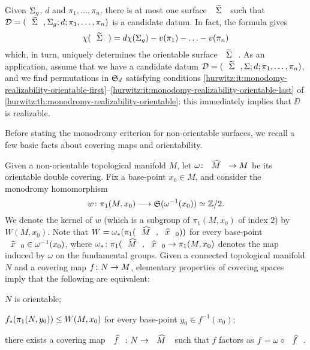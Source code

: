\begin{remark}\label{hurwitz:rm:sigma-tilde-unique-orientable}
Given $\Sigma_{g}$, $d$ and $\pi_1,\ldots,\pi_n$, there is at most one surface $\tSigma$ such that $\DD=\datum{\tSigma,\surf{g}}{d}{\pi_1,\ldots,\pi_n}$ is a candidate datum. In fact, the \RH{} formula gives
\[
\chi(\tSigma)=d\chi(\surf{g})-v(\pi_1)-\ldots-v(\pi_n)
\]
which, in turn, uniquely determines the orientable surface $\tSigma$. As an application, assume that we have a candidate datum $\DD=\datum{\tSigma,\Sigma}{d}{\pi_1,\ldots,\pi_n}$, and we find permutations in $\symgroup[d]$ satisfying conditions \ref{hurwitz:it:monodomy-realizability-orientable-first}--\ref{hurwitz:it:monodomy-realizability-orientable-last} of \cref{hurwitz:th:monodromy-realizability-orientable}: this immediately implies that $\DD$ is realizable.
\end{remark}

Before stating the monodromy criterion for non-orientable surfaces, we recall a few basic facts about covering maps and orientability.

Given a non-orientable topological manifold $M$, let $\map{\omega}{\what{M}}{M}$ be its orientable double covering. Fix a base-point $x_0\in M$, and consider the monodromy homomorphism
\[
\map{w}{\pi_1(M,x_0)}{\symgroup(\omega^{-1}(x_0))\iso\ZZ/2}.
\]
We denote the kernel of $w$ (which is a subgroup of $\pi_1(M,x_0)$ of index $2$) by $W(M,x_0)$. Note that $W=\omega_\ast(\pi_1(\what{M},\what{x}_0))$ for every base-point $\what{x}_0\in\omega^{-1}(x_0)$, where $\map{\omega_\ast}{\pi_1(\what{M},\what{x}_0}{\pi_1(M,x_0)}$ denotes the map induced by $\omega$ on the fundamental groups. Given a connected topological manifold $N$ and a covering map $\map{f}{N}{M}$, elementary properties of covering spaces imply that the following are equivalent:
\begin{enumroman}
\item $N$ is orientable;
\item $f_\ast(\pi_1(N,y_0))\le W(M,x_0)$ for every base-point $y_0\in f^{-1}(x_0)$;
\item there exists a covering map $\map{\what{f}}{N}{\what{M}}$ such that $f$ factors as $f=\omega\circ\what{f}$.
\end{enumroman}

